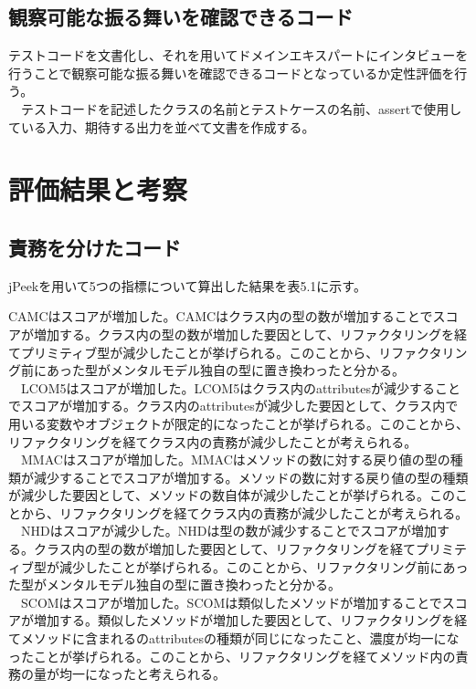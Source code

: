 \documentclass[12pt, a4paper]{jreport}
\begin{document}
\subsection{観察可能な振る舞いを確認できるコード}
テストコードを文書化し、それを用いてドメインエキスパートにインタビューを行うことで観察可能な振る舞いを確認できるコードとなっているか定性評価を行う。
\\　テストコードを記述したクラスの名前とテストケースの名前、assertで使用している入力、期待する出力を並べて文書を作成する。
\section{評価結果と考察}
\subsection{責務を分けたコード}
jPeekを用いて5つの指標について算出した結果を表5.1に示す。
\begin{table}[H]
\centering
\caption{jPeekによる算出結果}
\label{ttt}
\end{table}
CAMCはスコアが増加した。CAMCはクラス内の型の数が増加することでスコアが増加する。クラス内の型の数が増加した要因として、リファクタリングを経てプリミティブ型が減少したことが挙げられる。このことから、リファクタリング前にあった型がメンタルモデル独自の型に置き換わったと分かる。
\\　LCOM5はスコアが増加した。LCOM5はクラス内のattributesが減少することでスコアが増加する。クラス内のattributesが減少した要因として、クラス内で用いる変数やオブジェクトが限定的になったことが挙げられる。このことから、リファクタリングを経てクラス内の責務が減少したことが考えられる。
\\　MMACはスコアが増加した。MMACはメソッドの数に対する戻り値の型の種類が減少することでスコアが増加する。メソッドの数に対する戻り値の型の種類が減少した要因として、メソッドの数自体が減少したことが挙げられる。このことから、リファクタリングを経てクラス内の責務が減少したことが考えられる。
\\　NHDはスコアが減少した。NHDは型の数が減少することでスコアが増加する。クラス内の型の数が増加した要因として、リファクタリングを経てプリミティブ型が減少したことが挙げられる。このことから、リファクタリング前にあった型がメンタルモデル独自の型に置き換わったと分かる。
\\　SCOMはスコアが増加した。SCOMは類似したメソッドが増加することでスコアが増加する。類似したメソッドが増加した要因として、リファクタリングを経てメソッドに含まれるのattributesの種類が同じになったこと、濃度が均一になったことが挙げられる。このことから、リファクタリングを経てメソッド内の責務の量が均一になったと考えられる。
\end{document}
